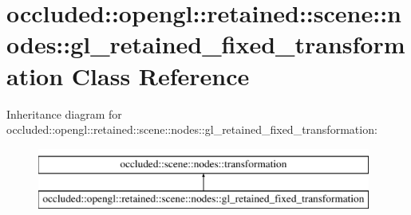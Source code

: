 \hypertarget{classoccluded_1_1opengl_1_1retained_1_1scene_1_1nodes_1_1gl__retained__fixed__transformation}{\section{occluded\+:\+:opengl\+:\+:retained\+:\+:scene\+:\+:nodes\+:\+:gl\+\_\+retained\+\_\+fixed\+\_\+transformation Class Reference}
\label{classoccluded_1_1opengl_1_1retained_1_1scene_1_1nodes_1_1gl__retained__fixed__transformation}
}
Inheritance diagram for occluded\+:\+:opengl\+:\+:retained\+:\+:scene\+:\+:nodes\+:\+:gl\+\_\+retained\+\_\+fixed\+\_\+transformation\+:\begin{figure}[H]
\begin{center}
\leavevmode
\includegraphics[height=2.000000cm]{classoccluded_1_1opengl_1_1retained_1_1scene_1_1nodes_1_1gl__retained__fixed__transformation}
\end{center}
\end{figure}

